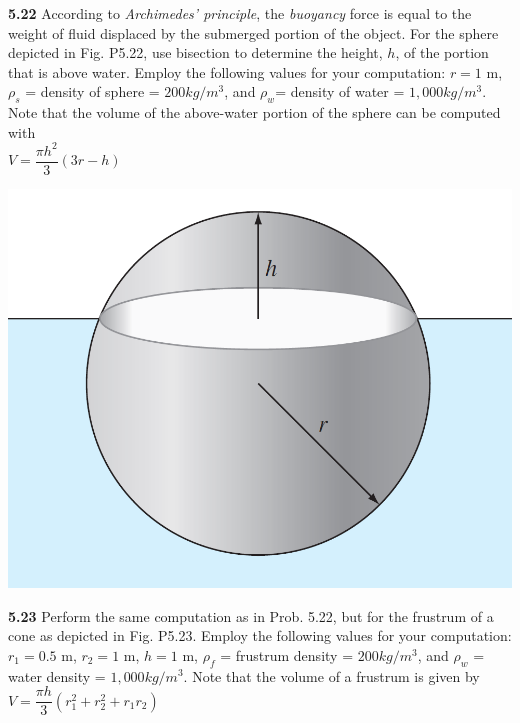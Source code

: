 \documentclass[../main.tex]{subfiles}
\begin{document}
\begin{multicols}{2}
    \noindent\textbf{5.22} According to \emph{Archimedes' principle}, the \emph{buoyancy} force
    is equal to the weight of fluid displaced by the submerged
    portion of the object. For the sphere depicted in Fig. P5.22,
    use bisection to determine the height, $h$, of the portion that is
    above water. Employ the following values for your computation:
    $r = 1$ m, $\rho_s$ = density of sphere = $200 kg/m^3$, and $\rho_w$=
    density of water = $1,000 kg/m^3$. Note that the volume of the
    above-water portion of the sphere can be computed with\\

    $V = \dfrac{\pi h^2}{3}(3r-h)$\\

    \noindent
    \begin{minipage}{\linewidth}
        \centering
        \includegraphics[width=0.8\linewidth]{./images/problem_5_9_4}
    \end{minipage}
    \bigskip

    \noindent\textbf{5.23} Perform the same computation as in Prob. 5.22, but for
    the frustrum of a cone as depicted in Fig. P5.23. Employ the
    following values for your computation: $r_1 = 0.5$ m, $r_2= 1$ m,
    $h=1$ m, $\rho_f$ = frustrum density = $200 kg/m^3$, and $\rho_w$ = water
    density = $1,000 kg/m^3$. Note that the volume of a frustrum is given by\\

    $V = \dfrac{\pi h}{3} (r^2_1 + r^2_2 + r_1r_2)$\\


\end{multicols}
\end{document}

